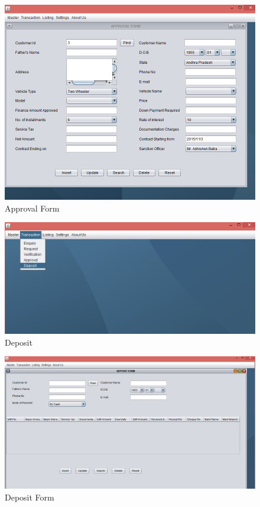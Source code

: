 \begin{figure}[ht]
\begin{center}
\includegraphics[scale=0.5]{images/image28.png}
\end{center}
\caption{Approval Form}
\label{Approval Form}
\end{figure}

\begin{figure}[ht]
\begin{center}
\includegraphics[scale=0.5]{images/image29.png}
\end{center}
\caption{Deposit}
\label{Deposit}
\end{figure}

\clearpage
\begin{figure}[ht]
\begin{center}
\includegraphics[scale=0.5]{images/image30.png}
\end{center}
\caption{Deposit Form}
\label{Deposit Form}
\end{figure}



